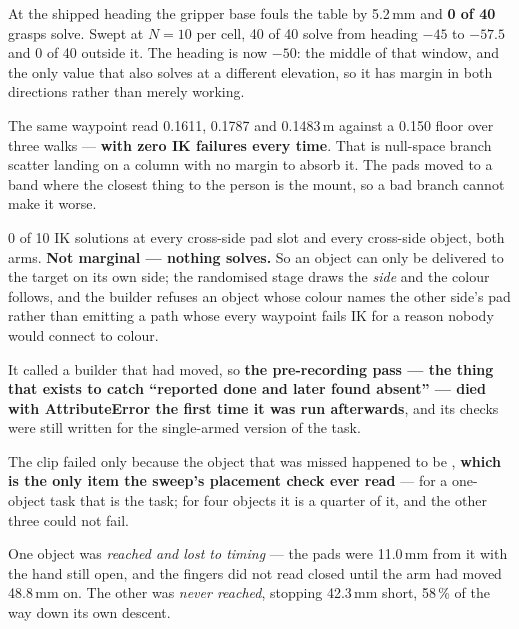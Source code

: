 {At the shipped heading the gripper base fouls the table by 5.2\,mm and
\textbf{0 of 40} grasps solve. Swept at $N=10$ per cell, 40 of 40 solve from
heading $-45$ to $-57.5$\dg{} and 0 of 40 outside it. The heading is now $-50$:
the middle of that window, and the only value that also solves at a different
elevation, so it has margin in both directions rather than merely working.}

{The same waypoint read 0.1611, 0.1787 and 0.1483\,m against a 0.150 floor over
three walks --- \textbf{with zero IK failures every time}. That is null-space
branch scatter landing on a column with no margin to absorb it. The pads moved
to a band where the closest thing to the person is the mount, so a bad branch
cannot make it worse.}

{0 of 10 IK solutions at every cross-side pad slot and every cross-side object,
both arms. \textbf{Not marginal --- nothing solves.} So an object can only be
delivered to the target on its own side; the randomised stage draws the
\emph{side} and the colour follows, and the builder refuses an object whose
colour names the other side's pad rather than emitting a path whose every
waypoint fails IK for a reason nobody would connect to colour.}

{It called a builder that had moved, so \textbf{the pre-recording pass --- the
thing that exists to catch ``reported done and later found absent'' --- died
with AttributeError the first time it was run afterwards}, and its checks were
still written for the single-armed version of the task.}

{The clip failed only because the object that was missed happened to be
, \textbf{which is the only item the sweep's placement check ever
read} --- for a one-object task that is the task; for four objects it is a
quarter of it, and the other three could not fail.}

{One object was \emph{reached and lost to timing} --- the pads were 11.0\,mm from
it with the hand still open, and the fingers did not read closed until the arm
had moved 48.8\,mm on. The other was \emph{never reached}, stopping 42.3\,mm
short, 58\,\% of the way down its own descent.}

